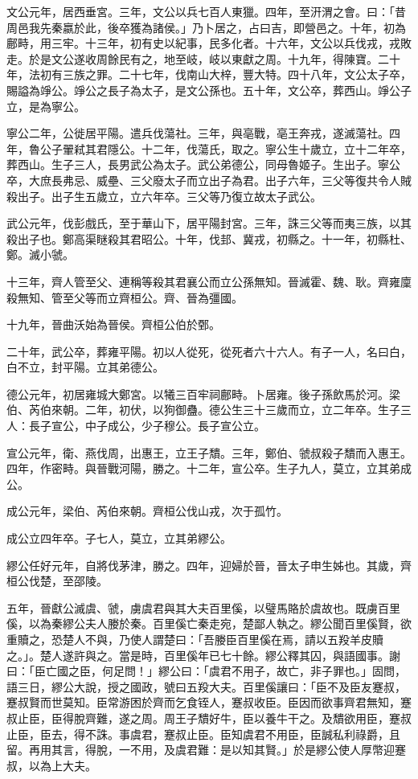 \begin{pinyinscope}
文公元年，居西垂宮。三年，文公以兵七百人東獵。四年，至汧渭之會。曰：「昔周邑我先秦嬴於此，後卒獲為諸侯。」乃卜居之，占曰吉，即營邑之。十年，初為鄜畤，用三牢。十三年，初有史以紀事，民多化者。十六年，文公以兵伐戎，戎敗走。於是文公遂收周餘民有之，地至岐，岐以東獻之周。十九年，得陳寶。二十年，法初有三族之罪。二十七年，伐南山大梓，豐大特。四十八年，文公太子卒，賜謚為竫公。竫公之長子為太子，是文公孫也。五十年，文公卒，葬西山。竫公子立，是為寧公。

寧公二年，公徙居平陽。遣兵伐蕩社。三年，與亳戰，亳王奔戎，遂滅蕩社。四年，魯公子翬弒其君隱公。十二年，伐蕩氏，取之。寧公生十歲立，立十二年卒，葬西山。生子三人，長男武公為太子。武公弟德公，同母魯姬子。生出子。寧公卒，大庶長弗忌、威壘、三父廢太子而立出子為君。出子六年，三父等復共令人賊殺出子。出子生五歲立，立六年卒。三父等乃復立故太子武公。

武公元年，伐彭戲氏，至于華山下，居平陽封宮。三年，誅三父等而夷三族，以其殺出子也。鄭高渠瞇殺其君昭公。十年，伐邽、冀戎，初縣之。十一年，初縣杜、鄭。滅小虢。

十三年，齊人管至父、連稱等殺其君襄公而立公孫無知。晉滅霍、魏、耿。齊雍廩殺無知、管至父等而立齊桓公。齊、晉為彊國。

十九年，晉曲沃始為晉侯。齊桓公伯於鄄。

二十年，武公卒，葬雍平陽。初以人從死，從死者六十六人。有子一人，名曰白，白不立，封平陽。立其弟德公。

德公元年，初居雍城大鄭宮。以犧三百牢祠鄜畤。卜居雍。後子孫飲馬於河。梁伯、芮伯來朝。二年，初伏，以狗御蠱。德公生三十三歲而立，立二年卒。生子三人：長子宣公，中子成公，少子穆公。長子宣公立。

宣公元年，衛、燕伐周，出惠王，立王子穨。三年，鄭伯、虢叔殺子穨而入惠王。四年，作密畤。與晉戰河陽，勝之。十二年，宣公卒。生子九人，莫立，立其弟成公。

成公元年，梁伯、芮伯來朝。齊桓公伐山戎，次于孤竹。

成公立四年卒。子七人，莫立，立其弟繆公。

繆公任好元年，自將伐茅津，勝之。四年，迎婦於晉，晉太子申生姊也。其歲，齊桓公伐楚，至邵陵。

五年，晉獻公滅虞、虢，虜虞君與其大夫百里傒，以璧馬賂於虞故也。既虜百里傒，以為秦繆公夫人媵於秦。百里傒亡秦走宛，楚鄙人執之。繆公聞百里傒賢，欲重贖之，恐楚人不與，乃使人謂楚曰：「吾媵臣百里傒在焉，請以五羖羊皮贖之。」。楚人遂許與之。當是時，百里傒年已七十餘。繆公釋其囚，與語國事。謝曰：「臣亡國之臣，何足問！」繆公曰：「虞君不用子，故亡，非子罪也。」固問，語三日，繆公大說，授之國政，號曰五羖大夫。百里傒讓曰：「臣不及臣友蹇叔，蹇叔賢而世莫知。臣常游困於齊而乞食铚人，蹇叔收臣。臣因而欲事齊君無知，蹇叔止臣，臣得脫齊難，遂之周。周王子穨好牛，臣以養牛干之。及穨欲用臣，蹇叔止臣，臣去，得不誅。事虞君，蹇叔止臣。臣知虞君不用臣，臣誠私利祿爵，且留。再用其言，得脫，一不用，及虞君難：是以知其賢。」於是繆公使人厚幣迎蹇叔，以為上大夫。


\end{pinyinscope}
